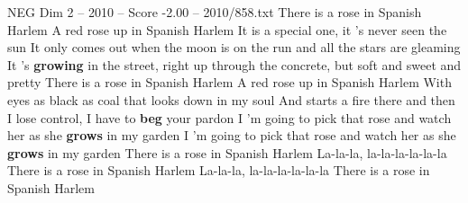 \begin{textsample}{NEG Dim 2 – 2010 – Score -2.00 – 2010/858.txt}  \label{ex:f2_neg_015}
There is a rose in Spanish Harlem A red rose up in Spanish Harlem It is a special one, it 's never seen the sun It only comes out when the moon is on the run and all the stars are gleaming It 's \textbf{growing} in the street, right up through the concrete, but soft and sweet and pretty There is a rose in Spanish Harlem A red rose up in Spanish Harlem With eyes as black as coal that looks down in my soul And starts a fire there and then I lose control, I have to \textbf{beg} your pardon I 'm going to pick that rose and watch her as she \textbf{grows} in my garden I 'm going to pick that rose and watch her as she \textbf{grows} in my garden There is a rose in Spanish Harlem La-la-la, la-la-la-la-la-la There is a rose in Spanish Harlem La-la-la, la-la-la-la-la-la There is a rose in Spanish Harlem

\end{textsample}
